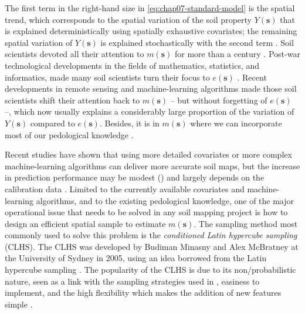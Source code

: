 \nointent The first term in the right-hand size in \autoref{eq:chap07-standard-model} is the spatial trend, 
which corresponds to the spatial variation of the soil property $Y(\boldsymbol{s})$ that is explained 
deterministically using spatially exhaustive covariates; the remaining spatial variation of 
$Y(\boldsymbol{s})$ is explained stochastically with the second term \cite{Cressie1993}. Soil scientists 
devoted all their attention to $m(\boldsymbol{s})$ for more than a century \cite{Jenny1961, Florinsky2012}. 
Post-war technological developments in the fields of mathematics, statistics, and informatics, made many soil 
scientists turn their focus to $e(\boldsymbol{s})$ \cite{WebsterEtAl1990}. Recent developments in remote 
sensing and machine-learning algorithms made those soil scientists shift their attention back to 
$m(\boldsymbol{s})$ \cite{MooreEtAl1993} -- but without forgetting of $e(\boldsymbol{s})$ \cite{OdehEtAl1994} 
--, which now usually explains a considerably large proportion of the variation of $Y(\boldsymbol{s})$ 
compared to $e(\boldsymbol{s})$\footgerard. Besides, it is in $m(\boldsymbol{s})$ where we can incorporate most 
of our pedological knowledge \cite{Lark2012}.

Recent studies have shown that using more detailed covariates or more complex machine-learning algorithms can 
deliver more accurate soil maps, but the increase in prediction performance may be modest 
(\cite{Samuel-RosaEtAl2015}) and largely depends on the calibration data \cite{HeungEtAl2016}. Limited to the 
currently available covariates and machine-learning algorithms, and to the existing pedological knowledge, one 
of the major operational issue that needs to be solved in any soil mapping project is how to design an 
efficient spatial sample to estimate $m(\boldsymbol{s})$. The sampling method most commonly used to solve this 
problem is the \emph{conditioned Latin hypercube sampling} (CLHS). The CLHS was developed by Budiman Minasny 
and Alex McBratney at the University of Sydney in 2005, using an idea borrowed from the Latin hypercube 
sampling \cite{McKayEtAl1979, MinasnyEtAl2006b}. The popularity of the CLHS is due to its non\-/probabilistic 
nature, seen as a link with the sampling strategies used in , easiness to 
implement, and the high flexibility which makes the addition of new features simple \cite{MinasnyEtAl2010a, 
RoudierEtAl2012, MulderEtAl2013, CarvalhoJuniorEtAl2014, CliffordEtAl2014}.

